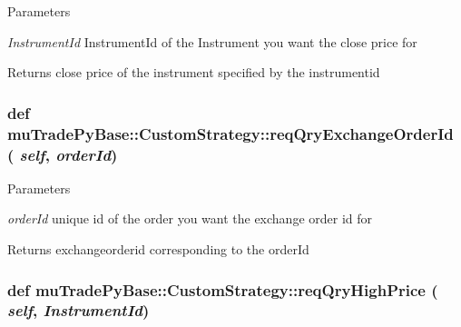 \begin{DoxyParams}{Parameters}
\item[{\em InstrumentId}]InstrumentId of the Instrument you want the close price for \end{DoxyParams}
\begin{DoxyReturn}{Returns}
close price of the instrument specified by the instrumentid 
\end{DoxyReturn}
\hypertarget{classmuTradePyBase_1_1CustomStrategy_a20cce64603fa41524a94e2c28231bb0d}{
\subsubsection[{reqQryExchangeOrderId}]{\setlength{\rightskip}{0pt plus 5cm}def muTradePyBase::CustomStrategy::reqQryExchangeOrderId ( {\em self}, \/   {\em orderId})}}
\label{classmuTradePyBase_1_1CustomStrategy_a20cce64603fa41524a94e2c28231bb0d}

\begin{DoxyParams}{Parameters}
\item[{\em orderId}]unique id of the order you want the exchange order id for \end{DoxyParams}
\begin{DoxyReturn}{Returns}
exchangeorderid corresponding to the orderId 
\end{DoxyReturn}
\hypertarget{classmuTradePyBase_1_1CustomStrategy_aa66a4eb7129af05c92f0beaf335dfcd3}{
\subsubsection[{reqQryHighPrice}]{\setlength{\rightskip}{0pt plus 5cm}def muTradePyBase::CustomStrategy::reqQryHighPrice ( {\em self}, \/   {\em InstrumentId})}}
\label{classmuTradePyBase_1_1CustomStrategy_aa66a4eb7129af05c92f0beaf335dfcd3}

